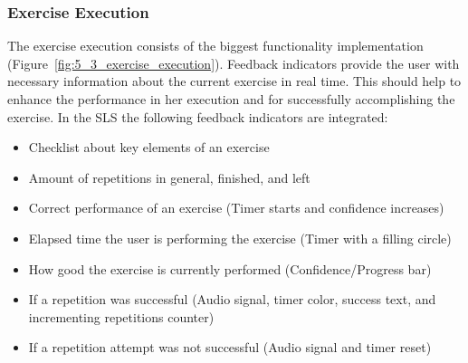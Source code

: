 \subsubsection{Exercise Execution}
The exercise execution consists of the biggest functionality implementation (Figure~\ref{fig:5_3_exercise_execution}). Feedback indicators provide the user with necessary information about the current exercise in real time. This should help to enhance the performance in her execution and for successfully accomplishing the exercise. In the SLS the following feedback indicators are integrated:

\begin{itemize}
\item Checklist about key elements of an exercise
\item Amount of repetitions in general, finished, and left
\item Correct performance of an exercise (Timer starts and confidence increases)
\item Elapsed time the user is performing the exercise (Timer with a filling circle)
\item How good the exercise is currently performed (Confidence/Progress bar)
\item If a repetition was successful (Audio signal, timer color, success text, and incrementing repetitions counter)
\item If a repetition attempt was not successful (Audio signal and timer reset)
\end{itemize}

